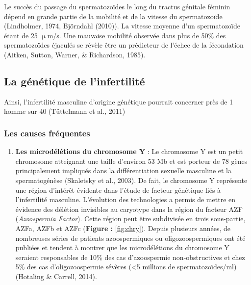 \documentclass[12pt,twoside]{reedthesis}
\providecommand{\tightlist}{%
  \setlength{\itemsep}{0pt}\setlength{\parskip}{0pt}}
\theoremstyle{definition}
\theoremstyle{definition}
\theoremstyle{remark}
\begin{document}
  Le succès du passage du spermatozoïdes le long du tractus génitale
  féminin dépend en grande partie de la mobilité et de la vitesse du
  spermatozoïde (Lindholmer, 1974, Björndahl (2010)). La vitesse moyenne
  d'un spermatozoïde étant de 25 \(\upmu\)m/s. Une mauvaise mobilité
  observée dans plus de 50\% des spermatozoïdes éjaculés se révèle être un
  prédicteur de l'échec de la fécondation (Aitken, Sutton, Warner, \&
  Richardson, 1985).
  
  \subsection{La génétique de
  l'infertilité}\label{la-genetique-de-linfertilite}
  
  Ainsi, l'infertilité masculine d'origine génétique pourrait concerner
  près de 1 homme sur 40 (Tüttelmann et al., 2011)
  
  \subsubsection{Les causes fréquentes}\label{les-causes-frequentes}
  
  \begin{enumerate}
  \def\labelenumi{\arabic{enumi}.}
  \tightlist
  \item
    \textbf{Les microdélétions du chromosome Y} : Le chromosome Y est un
    petit chromosome atteignant une taille d'environ 53 Mb et est porteur
    de 78 gènes principalement impliqués dans la différentiation sexuelle
    masculine et la spermatogénèse (Skaletsky et al., 2003). De fait, le
    chromosome Y représente une région d'intérêt évidente dans l'étude de
    facteur génétique liés à l'infertilité masculine. L'évolution des
    technologies a permis de mettre en évidence des délétion invisibles au
    caryotype dans la région du facteur AZF (\emph{Azoospermia Factor}).
    Cette région peut être subdivisée en trois sous-partie, AZFa, AZFb et
    AZFc (\textbf{Figure :} \ref{fig:chry}). Depuis plusieurs années, de
    nombreuses séries de patients azoospermiques ou oligozoospermiques ont
    été publiées et tendent à montrer que les microdélétions du chromosome
    Y seraient responsables de 10\% des cas d'azoospermie non-obstructives
    et chez 5\% des cas d'oligozoospermie sévères (\textless{}5 millions
    de spermatozoïdes/ml) (Hotaling \& Carrell, 2014).
  \end{enumerate}
  
\end{document}
